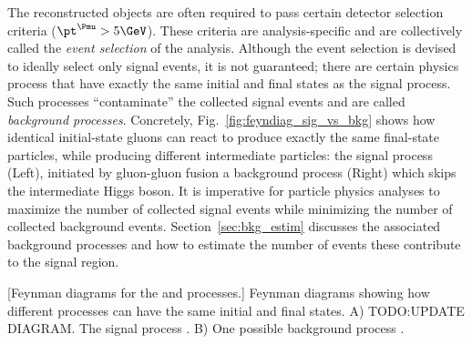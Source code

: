 The reconstructed objects are often required to pass certain detector selection criteria (\eg $\pt^\Pmu > 5\GeV$).
These criteria are analysis-specific and are collectively called the \emph{event selection} of the analysis.
Although the event selection is devised to ideally select only signal events, it is not guaranteed;
there are certain physics process that have exactly the same initial and final states as the signal process.
Such processes ``contaminate'' the collected signal events and are called \emph{background processes}.
Concretely, Fig.~\ref{fig:feyndiag_sig_vs_bkg} shows how identical initial-state gluons can react to produce exactly the same final-state particles, while producing different intermediate particles:
the signal process (Left), initiated by gluon-gluon fusion \vs a background process (Right) which skips the intermediate Higgs boson.
It is imperative for particle physics analyses to maximize the number of collected signal events while minimizing the number of collected background events.
Section~\ref{sec:bkg_estim} discusses the associated background processes and how to estimate the number of events these contribute to the signal region.
\begin{multiFigure}
	\centering
	[Feynman diagrams for the \gghzzfourl and \ggzzstarfourl processes.]
	{Feynman diagrams showing how different processes can have the same initial and final states.
	A) TODO:UPDATE DIAGRAM. The signal process \gghzzfourl.
	B) One possible background process \ggzzstarfourl.}
	\label{fig:feyndiag_sig_vs_bkg}
\end{multiFigure}



